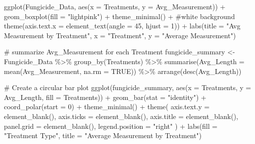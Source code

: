 \documentclass[
  10pt,
  letterpaper,
  twocolumn]{article}
\newenvironment{Shaded}{\begin{snugshade}}{\end{snugshade}}
\newcommand{\AttributeTok}[1]{\textcolor[rgb]{0.40,0.45,0.13}{#1}}
\newcommand{\CommentTok}[1]{\textcolor[rgb]{0.37,0.37,0.37}{#1}}
\newcommand{\ConstantTok}[1]{\textcolor[rgb]{0.56,0.35,0.01}{#1}}
\newcommand{\DecValTok}[1]{\textcolor[rgb]{0.68,0.00,0.00}{#1}}
\newcommand{\FunctionTok}[1]{\textcolor[rgb]{0.28,0.35,0.67}{#1}}
\newcommand{\NormalTok}[1]{\textcolor[rgb]{0.00,0.23,0.31}{#1}}
\newcommand{\OtherTok}[1]{\textcolor[rgb]{0.00,0.23,0.31}{#1}}
\newcommand{\SpecialCharTok}[1]{\textcolor[rgb]{0.37,0.37,0.37}{#1}}
\newcommand{\StringTok}[1]{\textcolor[rgb]{0.13,0.47,0.30}{#1}}
\begin{document}
\begin{Shaded}
\begin{Highlighting}[]
\FunctionTok{ggplot}\NormalTok{(Fungicide\_Data, }\FunctionTok{aes}\NormalTok{(}\AttributeTok{x =}\NormalTok{ Treatments, }\AttributeTok{y =}\NormalTok{ Avg\_Measurement)) }\SpecialCharTok{+}
  \FunctionTok{geom\_boxplot}\NormalTok{(}\AttributeTok{fill =} \StringTok{"lightpink"}\NormalTok{) }\SpecialCharTok{+}
  \FunctionTok{theme\_minimal}\NormalTok{() }\SpecialCharTok{+}   \CommentTok{\#white background}
  \FunctionTok{theme}\NormalTok{(}\AttributeTok{axis.text.x =} \FunctionTok{element\_text}\NormalTok{(}\AttributeTok{angle =} \DecValTok{45}\NormalTok{, }\AttributeTok{hjust =} \DecValTok{1}\NormalTok{)) }\SpecialCharTok{+}
  \FunctionTok{labs}\NormalTok{(}\AttributeTok{title =} \StringTok{"Avg Measurement by Treatment"}\NormalTok{,}
       \AttributeTok{x =} \StringTok{"Treatment"}\NormalTok{,}
       \AttributeTok{y =} \StringTok{"Average Measurement"}\NormalTok{)}


\CommentTok{\# summarize Avg\_Measurement for each Treatment}
\NormalTok{fungicide\_summary }\OtherTok{\textless{}{-}}\NormalTok{ Fungicide\_Data }\SpecialCharTok{\%\textgreater{}\%}
  \FunctionTok{group\_by}\NormalTok{(Treatments) }\SpecialCharTok{\%\textgreater{}\%}
  \FunctionTok{summarise}\NormalTok{(}\AttributeTok{Avg\_Length =} \FunctionTok{mean}\NormalTok{(Avg\_Measurement, }\AttributeTok{na.rm =} \ConstantTok{TRUE}\NormalTok{)) }\SpecialCharTok{\%\textgreater{}\%}
  \FunctionTok{arrange}\NormalTok{(}\FunctionTok{desc}\NormalTok{(Avg\_Length))}

\CommentTok{\# Create a circular bar plot}
\FunctionTok{ggplot}\NormalTok{(fungicide\_summary, }\FunctionTok{aes}\NormalTok{(}\AttributeTok{x =}\NormalTok{ Treatments, }\AttributeTok{y =}\NormalTok{ Avg\_Length, }\AttributeTok{fill =}\NormalTok{ Treatments)) }\SpecialCharTok{+}
  \FunctionTok{geom\_bar}\NormalTok{(}\AttributeTok{stat =} \StringTok{"identity"}\NormalTok{) }\SpecialCharTok{+}
  \FunctionTok{coord\_polar}\NormalTok{(}\AttributeTok{start =} \DecValTok{0}\NormalTok{) }\SpecialCharTok{+}
  \FunctionTok{theme\_minimal}\NormalTok{() }\SpecialCharTok{+}
  \FunctionTok{theme}\NormalTok{(}
    \AttributeTok{axis.text.y =} \FunctionTok{element\_blank}\NormalTok{(),}
    \AttributeTok{axis.ticks =} \FunctionTok{element\_blank}\NormalTok{(),}
    \AttributeTok{axis.title =} \FunctionTok{element\_blank}\NormalTok{(),}
    \AttributeTok{panel.grid =} \FunctionTok{element\_blank}\NormalTok{(),}
    \AttributeTok{legend.position =} \StringTok{"right"}
\NormalTok{  ) }\SpecialCharTok{+}
  \FunctionTok{labs}\NormalTok{(}\AttributeTok{fill =} \StringTok{"Treatment Type"}\NormalTok{, }\AttributeTok{title =} \StringTok{"Average Measurement by Treatment"}\NormalTok{)}



\end{Highlighting}
\end{Shaded}
\end{document}

